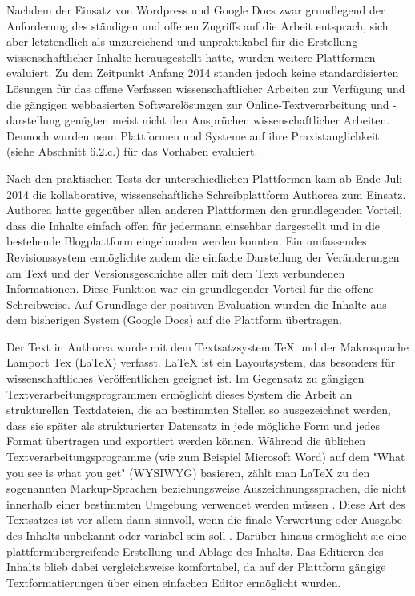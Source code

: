 Nachdem der Einsatz von Wordpress und Google Docs zwar grundlegend der Anforderung des ständigen und offenen Zugriffs auf die Arbeit entsprach, sich aber letztendlich als unzureichend und unpraktikabel für die Erstellung wissenschaftlicher Inhalte herausgestellt hatte, wurden weitere Plattformen evaluiert. Zu dem Zeitpunkt Anfang 2014 standen jedoch keine standardisierten Lösungen für das offene Verfassen wissenschaftlicher Arbeiten zur Verfügung und die gängigen webbasierten Softwarelösungen zur Online-Textverarbeitung und -darstellung genügten meist nicht den Ansprüchen wissenschaftlicher Arbeiten. Dennoch wurden neun Plattformen und Systeme auf ihre Praxistauglichkeit (siehe Abschnitt 6.2.c.) für das Vorhaben evaluiert.

Nach den praktischen Tests der unterschiedlichen Plattformen kam ab Ende Juli 2014 die kollaborative, wissenschaftliche Schreibplattform Authorea zum Einsatz. Authorea hatte gegenüber allen anderen Plattformen den grundlegenden Vorteil, dass die Inhalte einfach offen für jedermann einsehbar dargestellt und in die bestehende Blogplattform eingebunden werden konnten. Ein umfassendes Revisionssystem ermöglichte zudem die einfache Darstellung der Veränderungen am Text und der Versionsgeschichte aller mit dem Text verbundenen Informationen. Diese Funktion war ein grundlegender Vorteil für die offene Schreibweise. Auf Grundlage der positiven Evaluation wurden die Inhalte aus dem bisherigen System (Google Docs) auf die Plattform übertragen.

Der Text in Authorea wurde mit dem Textsatzsystem TeX und der Makrosprache Lamport Tex (LaTeX) verfasst. LaTeX ist ein Layoutsystem, das besonders für wissenschaftliches Veröffentlichen geeignet ist. Im Gegensatz zu gängigen Textverarbeitungsprogrammen ermöglicht dieses System die Arbeit an strukturellen Textdateien, die an bestimmten Stellen so ausgezeichnet werden, dass sie später als strukturierter Datensatz in jede mögliche Form und jedes Format übertragen und exportiert werden können. Während die üblichen Textverarbeitungsprogramme (wie zum Beispiel Microsoft Word) auf dem "What you see is what you get" (WYSIWYG) basieren, zählt man LaTeX zu den sogenannten Markup-Sprachen beziehungsweise Auszeichnungssprachen, die nicht innerhalb einer bestimmten Umgebung verwendet werden müssen \cite{Sievers_2012}. Diese Art des Textsatzes ist vor allem dann sinnvoll, wenn die finale Verwertung oder Ausgabe des Inhalts unbekannt oder variabel sein soll \cite{Braune_2007}. Darüber hinaus ermöglicht sie eine plattformübergreifende Erstellung und Ablage des Inhalts. Das Editieren des Inhalts blieb dabei vergleichsweise komfortabel, da auf der Plattform gängige Textformatierungen über einen einfachen Editor ermöglicht wurden.

